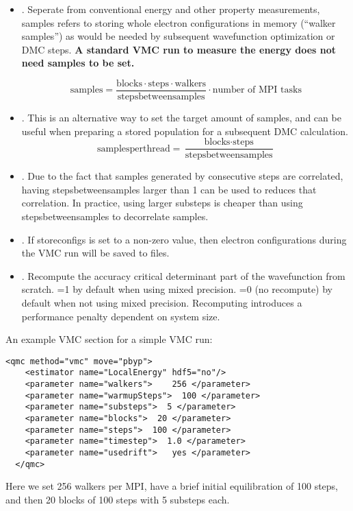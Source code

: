 \begin{itemize}
\item {}. Seperate from conventional energy and other
  property measurements, samples refers to storing whole electron
  configurations in memory (``walker samples'') as would be needed by subsequent
  wavefunction optimization or DMC steps. \textbf{A standard VMC run to
  measure the energy does not need samples to be set.}

\[
\textrm{samples}=
\frac{\textrm{blocks}\cdot\textrm{steps}\cdot\textrm{walkers}}{\textrm{stepsbetweensamples}}\cdot\textrm{number of MPI tasks}
\]

\item {}. This is an alternative way to set the target amount of samples, and can be useful when preparing a stored population for a subsequent DMC calculation.
\[
\textrm{samplesperthread}=
\frac{\textrm{blocks}\cdot\textrm{steps}}{\textrm{stepsbetweensamples}}
\]

\item {}. Due to the fact that samples generated by consecutive steps are correlated, having stepsbetweensamples larger than 1 can be used to reduces that correlation. In practice, using larger substeps is cheaper than using stepsbetweensamples to decorrelate samples. 

\item {}. If storeconfigs is set to a non-zero value, then electron configurations during the VMC run will be saved to files.

\item {}. Recompute the accuracy critical determinant part of the wavefunction
  from scratch. =1 by default when using mixed precision. =0 (no
  recompute) by default when not using mixed precision. Recomputing
  introduces a performance penalty dependent on system size.
\end{itemize}

An example VMC section for a simple VMC run:
\begin{lstlisting}[style=QMCPXML]
  <qmc method="vmc" move="pbyp">
    <estimator name="LocalEnergy" hdf5="no"/>
    <parameter name="walkers">    256 </parameter>
    <parameter name="warmupSteps">  100 </parameter>
    <parameter name="substeps">  5 </parameter>
    <parameter name="blocks">  20 </parameter>
    <parameter name="steps">  100 </parameter>
    <parameter name="timestep">  1.0 </parameter>
    <parameter name="usedrift">   yes </parameter>
  </qmc>
\end{lstlisting}
Here we set 256 walkers per MPI, have a brief initial equilibration of 100 steps, and then 20 blocks of 100 steps with 5 substeps each.

